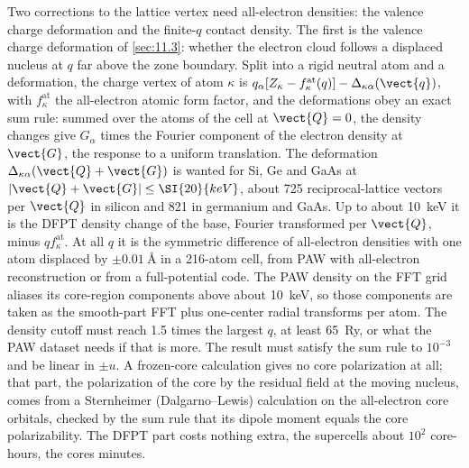 Two corrections to the lattice vertex need all-electron densities: the valence charge deformation and the finite-$q$ contact density. The first is the valence charge deformation of \cref{sec:11.3}: whether the electron cloud follows a displaced nucleus at $q$ far above the zone boundary. Split into a rigid neutral atom and a deformation, the charge vertex of atom $\kappa$ is $q_\alpha[Z_\kappa - f^{\mathrm{at}}_\kappa(q)] - \Delta_{\kappa\alpha}(\vect{q})$, with $f^{\mathrm{at}}_\kappa$ the all-electron atomic form factor, and the deformations obey an exact sum rule: summed over the atoms of the cell at $\vect{Q} = 0$, the density changes give $G_\alpha$ times the Fourier component of the electron density at $\vect{G}$, the response to a uniform translation. The deformation $\Delta_{\kappa\alpha}(\vect{Q}+\vect{G})$ is wanted for Si, Ge and GaAs at $|\vect{Q}+\vect{G}| \le \SI{20}{keV}$, about 725 reciprocal-lattice vectors per $\vect{Q}$ in silicon and 821 in germanium and GaAs. Up to about \SI{10}{keV} it is the DFPT density change of the base, Fourier transformed per $\vect{Q}$, minus $q f^{\mathrm{at}}_\kappa$. At all $q$ it is the symmetric difference of all-electron densities with one atom displaced by $\pm\SI{0.01}{\angstrom}$ in a 216-atom cell, from PAW with all-electron reconstruction or from a full-potential code. The PAW density on the FFT grid aliases its core-region components above about \SI{10}{keV}, so those components are taken as the smooth-part FFT plus one-center radial transforms per atom. The density cutoff must reach 1.5 times the largest $q$, at least \SI{65}{Ry}, or what the PAW dataset needs if that is more. The result must satisfy the sum rule to $10^{-3}$ and be linear in $\pm u$. A frozen-core calculation gives no core polarization at all; that part, the polarization of the core by the residual field at the moving nucleus, comes from a Sternheimer (Dalgarno--Lewis) calculation on the all-electron core orbitals, checked by the sum rule that its dipole moment equals the core polarizability. The DFPT part costs nothing extra, the supercells about $10^2$ core-hours, the cores minutes.

